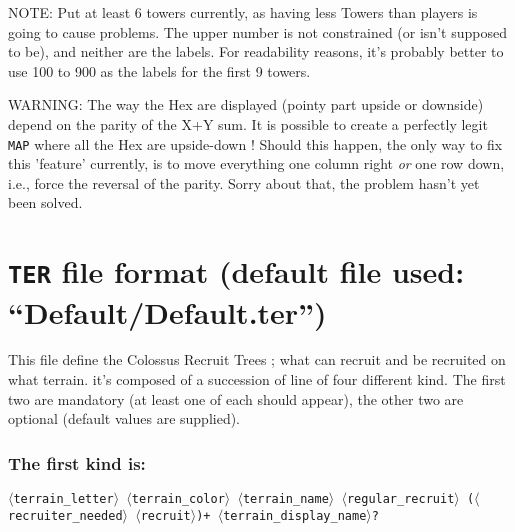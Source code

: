 \documentclass{article}
\begin{document}
NOTE: Put at least 6 towers currently, as having less Towers than players is going to cause problems. The upper number is not constrained (or isn't supposed to be), and neither are the labels. For readability reasons, it's probably better to use 100 to 900 as the labels for the first 9 towers.

WARNING: The way the Hex are displayed (pointy part upside or downside) depend on the parity of the X+Y sum. It is possible to create a perfectly legit \texttt{MAP} where all the Hex are upside-down ! Should this happen, the only way to fix this 'feature' currently, is to move everything one column right \emph{or} one row down, i.e., force the reversal of the parity. Sorry about that, the problem hasn't yet been solved.

\section{\texttt{TER} file format (default file used: ``Default/Default.ter'')}
\label{TER}

This file define the Colossus Recruit Trees ; what can recruit and be recruited on what terrain. it's composed of a succession of line of four different kind.
The first two are mandatory (at least one of each should appear), the other two are optional (default values are supplied).

\subsubsection*{The first kind is:}

\texttt{$\langle$terrain\_letter$\rangle$ $\langle$terrain\_color$\rangle$ $\langle$terrain\_name$\rangle$ $\langle$regular\_recruit$\rangle$ ($\langle$recruiter\_needed$\rangle$ $\langle$recruit$\rangle$)+ $\langle$terrain\_display\_name$\rangle$?}
\end{document}
